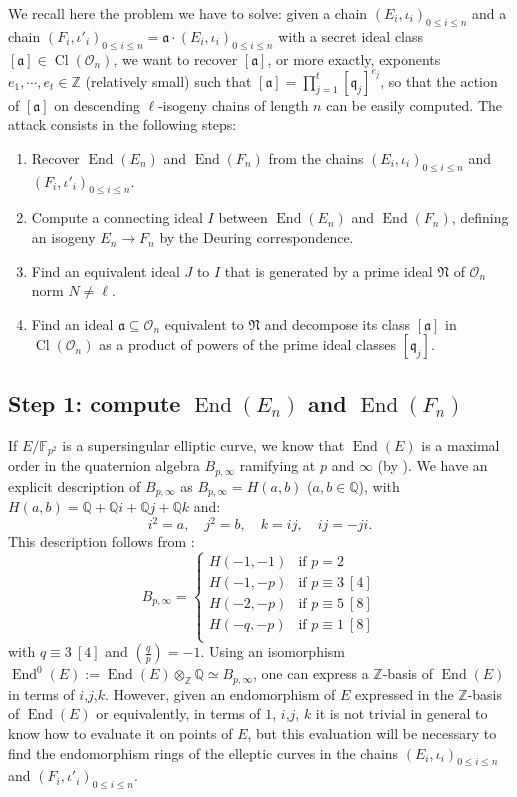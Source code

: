 \documentclass[a4paper,10pt,notitlepage]{report}
\theoremstyle{definition}
\theoremstyle{plain}
\theoremstyle{definition}
\newcommand{\Z}{\mathbb{Z}}
\newcommand{\Q}{\mathbb{Q}}
\newcommand{\F}{\mathbb{F}}
\newcommand{\mO}{\mathcal{O}}
\renewcommand{\(}{\left(}
\renewcommand{\)}{\right)}
\newcommand{\mf}[1]{\mathfrak{#1}}
\DeclareMathOperator{\End}{End}
\DeclareMathOperator{\Cl}{Cl}
\begin{document}
We recall here the problem we have to solve: given a chain $(E_i,\iota_i)_{0\leq i\leq n}$ and a chain $(F_i,\iota'_i)_{0\leq i\leq n}=\mf{a}\cdot(E_i,\iota_i)_{0\leq i\leq n}$ with a secret ideal class $[\mf{a}]\in\Cl(\mO_n)$, we want to recover $[\mf{a}]$, or more exactly, exponents $e_1,\cdots, e_t\in\Z$ (relatively small) such that $[\mf{a}]=\prod_{j=1}^t[\mf{q}_j]^{e_j}$, so that the action of $[\mf{a}]$ on descending $\ell$-isogeny chains of length $n$ can be easily computed. The attack consists in the following steps:
\begin{enumerate}
\item Recover $\End(E_n)$ and $\End(F_n)$ from the chains $(E_i,\iota_i)_{0\leq i\leq n}$ and $(F_i,\iota'_i)_{0\leq i\leq n}$.
\item Compute a connecting ideal $I$ between $\End(E_n)$ and $\End(F_n)$, defining an isogeny $E_n\longrightarrow F_n$ by the Deuring correspondence.
\item Find an equivalent ideal $J$ to $I$ that is generated by a prime ideal $\mf{N}$ of $\mO_n$ norm $N\neq\ell$.
\item Find an ideal $\mf{a}\subseteq \mO_n$ equivalent to $\mf{N}$ and decompose its class $[\mf{a}]$ in $\Cl(\mO_n)$ as a product of powers of the prime ideal classes $[\mf{q}_j]$.
\end{enumerate}

\subsection{Step 1: compute $\End(E_n)$ and $\End(F_n)$}\label{Paragraph 6}

If $E/\F_{p^2}$ is a supersingular elliptic curve, we know that $\End(E)$ is a maximal order in the quaternion algebra $B_{p,\infty}$ ramifying at $p$ and $\infty$ (by \cite[Theorem 42.1.9]{Voight}).  We have an explicit description of $B_{p,\infty}$ as $B_{p,\infty}=H(a,b)$ ($a,b\in\Q$), with $H(a,b)=\Q+\Q i+\Q j+\Q k$ and:
\[i^2=a, \quad j^2=b, \quad k=ij,\quad ij=-ji.\]
This description follows from \cite[Proposition 5.1]{Pizer80}:
\[B_{p,\infty}=\left\{\begin{array}{cl}
H(-1,-1) & \mbox{if } p=2\\
H(-1,-p) & \mbox{if } p\equiv 3 \ [4]\\
H(-2,-p)  & \mbox{if } p\equiv 5 \ [8]\\
H(-q,-p)  & \mbox{if } p\equiv 1 \ [8]\\
\end{array}\right.\]
with $q\equiv 3 \ [4]$ and $\(\frac{q}{p}\)=-1$. Using an isomorphism $\End^0(E):=\End(E)\otimes_\Z\Q\simeq B_{p,\infty}$, one can express a $\Z$-basis of $\End(E)$ in terms of $i$,$j$,$k$. However, given an endomorphism of $E$ expressed in the $\Z$-basis of $\End(E)$ or equivalently, in terms of $1$, $i$,$j$, $k$ it is not trivial in general to know how to evaluate it on points of $E$, but this evaluation will be necessary to find the endomorphism rings of the elleptic curves in the chains  $(E_i,\iota_i)_{0\leq i\leq n}$ and $(F_i,\iota'_i)_{0\leq i\leq n}$. 
\end{document}
